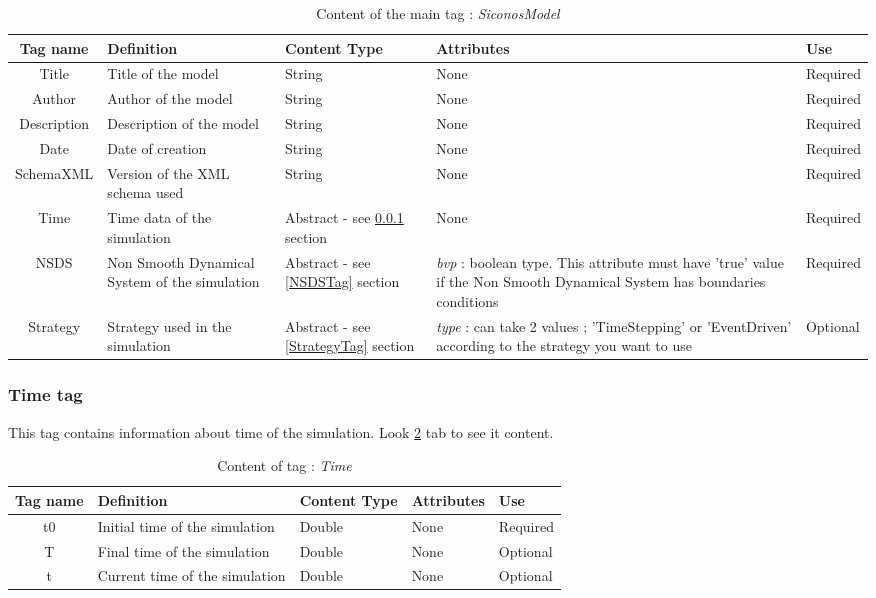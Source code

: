 \begin{table}[!hbp]
\begin{center}
\begin{tabular}{|c|p{5cm}|p{2cm}|p{4cm}|p{2cm}|}
\hline
\bf{Tag name} & \bf{Definition} & \bf{Content Type} & \bf{Attributes} & \bf{Use}
\\\hline
\hline
Title		  & Title of the model & String & None & Required \\
\hline
Author		  & Author of the model & String & None & Required \\
\hline
Description	  & Description of the model & String & None & Required \\
\hline
Date		  & Date of creation & String & None & Required \\
\hline
SchemaXML	  & Version of the XML schema used & String & None & Required \\
\hline
Time		  & Time data of the simulation & Abstract - see \ref{TimeTag} section & None & Required \\
\hline
NSDS	    & Non Smooth Dynamical System of the simulation & Abstract - see \ref{NSDSTag} section & \textit{bvp} : boolean type. This attribute must have 'true' value if the Non Smooth Dynamical System has boundaries conditions & Required \\
\hline
Strategy  & Strategy used in the simulation & Abstract - see \ref{StrategyTag} section & \textit{type} :
can take 2 values ; 'TimeStepping' or 'EventDriven' according to the strategy you want to use & Optional \\
\hline
\end{tabular}
\end{center}
\caption{Content of the main tag : \textit{SiconosModel}}
\label{tab-siconosModel}
\end{table}




\subsubsection{Time tag}
\label{TimeTag}

This tag contains information about time of the simulation.
Look \ref{tab-time} tab to see it content.

\begin{table}[!hbp]
\begin{center}
\begin{tabular}{|c|p{6cm}|p{2cm}|p{2cm}|p{2cm}|}
\hline
\bf{Tag name} & \bf{Definition} & \bf{Content Type} & \bf{Attributes} &\bf{Use}
\\\hline
\hline
t0		  & Initial time of the simulation & Double & None & Required \\
\hline
T	          & Final time of the simulation & Double & None & Optional \\
\hline
t	          & Current time of the simulation & Double & None & Optional \\
\hline
\end{tabular}
\end{center}
\caption{Content of tag : \textit{Time}}
\label{tab-time}
\end{table}



